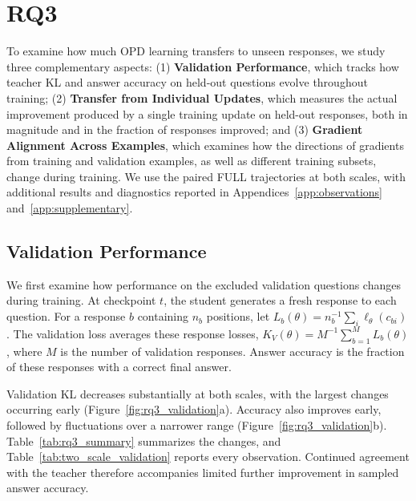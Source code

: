 
\section{RQ3}
\label{sec:RQ3}
\label{sec:generalization}

To examine how much OPD learning transfers to unseen
responses, we study three complementary aspects:
(1) \textbf{Validation Performance}, which tracks
how teacher KL and answer accuracy on held-out
questions evolve throughout training;
(2) \textbf{Transfer from Individual Updates}, which
measures the actual improvement produced by a single
training update on held-out responses, both in
magnitude and in the fraction of responses improved;
and (3) \textbf{Gradient Alignment Across Examples},
which examines how the directions of gradients from
training and validation examples, as well as different
training subsets, change during training.
We use the paired FULL trajectories at both scales,
with additional results and diagnostics reported in
Appendices~\ref{app:observations}
and~\ref{app:supplementary}.

\subsection{Validation Performance}
\label{sec:rq3_validation}
We first examine how performance on the excluded validation questions changes during training. At checkpoint $t$, the student generates a fresh response to each question. For a response $b$ containing $n_b$ positions, let $L_b(\theta)=n_b^{-1}\sum_i\ell_\theta(c_{bi})$. The validation loss averages these response losses, $K_V(\theta)=M^{-1}\sum_{b=1}^{M}L_b(\theta)$, where $M$ is the number of validation responses. Answer accuracy is the fraction of these responses with a correct final answer.

Validation KL decreases substantially at both scales, with the largest changes occurring early (Figure~\ref{fig:rq3_validation}a). Accuracy also improves early, followed by fluctuations over a narrower range (Figure~\ref{fig:rq3_validation}b). Table~\ref{tab:rq3_summary} summarizes the changes, and Table~\ref{tab:two_scale_validation} reports every observation. Continued agreement with the teacher therefore accompanies limited further improvement in sampled answer accuracy.


